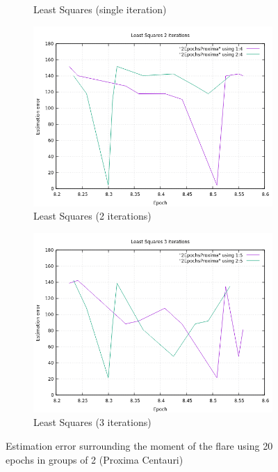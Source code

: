 \begin{figure}[!htb]
\begin{subfigure}[b]{0.5\textwidth}
		\caption{Least Squares (single iteration)}
	\end{subfigure}
	\hfill
	\begin{subfigure}[b]{0.5\textwidth}
		\includegraphics[width=\linewidth]{images/resultsStellar/20Epochs2Epochs/2EpochsProximaLS2.png}
		\caption{Least Squares (2 iterations)}
	\end{subfigure}
	\hfill
	\begin{subfigure}[b]{0.5\textwidth}
		\includegraphics[width=\linewidth]{images/resultsStellar/20Epochs2Epochs/2EpochsProximaLS3.png}
		\caption{Least Squares (3 iterations)}
	\end{subfigure}
	\caption{Estimation error surrounding the moment of the flare using 20 epochs in groups of 2 (Proxima Centauri)}
	\label{fig:proximaCentauri1Epoch102Group}
\end{figure}

